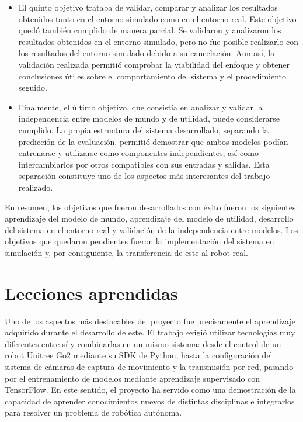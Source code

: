 \begin{itemize}
  \item El quinto objetivo trataba de validar, comparar y analizar los resultados obtenidos tanto en el entorno simulado como en el entorno real. Este objetivo quedó también cumplido de manera 
  parcial. Se validaron y analizaron los resultados obtenidos en el entorno simulado, pero no fue posible realizarlo con los resultados del entorno simulado debido a su cancelación. Aun así, la 
  validación realizada permitió comprobar la viabilidad del enfoque y obtener conclusiones útiles sobre el comportamiento del sistema y el procedimiento seguido.

  \item Finalmente, el último objetivo, que consistía en analizar y validar la independencia entre modelos de mundo y de utilidad, puede considerarse cumplido. La propia estructura del sistema 
  desarrollado, separando la predicción de la evaluación, permitió demostrar que ambos modelos podían entrenarse y utilizarse como componentes independientes, así como intercambiarlos por otros 
  compatibles con sus entradas y salidas. Esta separación constituye uno de los aspectos más interesantes del trabajo realizado.

\end{itemize}

En resumen, los objetivos que fueron desarrollados con éxito fueron los siguientes: aprendizaje del modelo de mundo, aprendizaje del modelo de utilidad, desarrollo del sistema en el entorno real 
y validación de la independencia entre modelos. Los objetivos que quedaron pendientes fueron la implementación del sistema en simulación y, por consiguiente, la transferencia de este al 
robot real.


\section{Lecciones aprendidas}
\label{sec:lecciones_aprendidas}

Uno de los aspectos más destacables del proyecto fue precisamente el aprendizaje adquirido durante el desarrollo de este. El trabajo exigió utilizar tecnologias muy diferentes entre sí y 
combinarlas en un mismo sistema: desde el control de un robot Unitree Go2 mediante su SDK de Python, hasta la configuración del sistema de cámaras de captura de movimiento y la transmisión 
por red, pasando por el entrenamiento de modelos mediante aprendizaje supervisado con TensorFlow. En este sentido, el proyecto ha servido como una demostración de la capacidad de aprender 
conocimientos nuevos de distintas disciplinas e integrarlos para resolver un problema de robótica autónoma.

